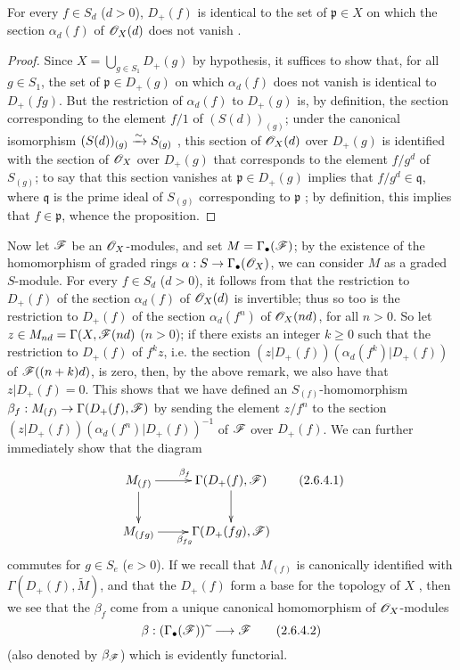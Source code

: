 \begin{proposition}[2.6.3]
\label{II.2.6.3}
For every $f\in S_d$ ($d>0$), $D_+(f)$ is identical to the set of $\mathfrak{p}\in X$ on which the section $\alpha_d(f)$ of $\mathscr{O}_X(d)$ does not vanish .
\end{proposition}

\begin{proof}
Since $X=\bigcup_{g\in S_1}D_+(g)$ by hypothesis, it suffices to show that, for all $g\in S_1$, the set of $\mathfrak{p}\in D_+(g)$ on which $\alpha_d(f)$ does not vanish is identical to $D_+(fg)$.
But the restriction of $\alpha_d(f)$ to $D_+(g)$ is, by definition, the section corresponding to the element $f/1$ of $(S(d))_{(g)}$;
under the canonical isomorphism $(S(d))_{(g)}\xrightarrow{\sim} S_{(g)}$ , this section of $\mathscr{O}_X(d)$ over $D_+(g)$ is identified with the section of $\mathscr{O}_X$ over $D_+(g)$ that corresponds to the element $f/g^d$ of $S_{(g)}$;
to say that this section vanishes at $\mathfrak{p}\in D_+(g)$ implies that $f/g^d\in\mathfrak{q}$, where $\mathfrak{q}$ is the prime ideal of $S_{(g)}$ corresponding to $\mathfrak{p}$ ;
by definition, this implies that $f\in\mathfrak{p}$, whence the proposition.
\end{proof}

\begin{env}[2.6.4]
\label{II.2.6.4}
Now let $\mathscr{F}$ be an $\mathscr{O}_X$-modules, and set $M=\Gamma_\bullet(\mathscr{F})$;
by the existence of the homomorphism of graded rings $\alpha: S\to\Gamma_\bullet(\sh{O}_X)$, we can consider $M$ as a graded $S$-module.
For every $f\in S_d$ ($d>0$), it follows from  that the restriction to $D_+(f)$ of the section $\alpha_d(f)$ of $\mathscr{O}_X(d)$ is invertible;
thus so too is the restriction to $D_+(f)$ of the section $\alpha_d(f^n)$ of $\mathscr{O}_X(nd)$, for all $n>0$.
So let $z\in M_{nd}=\Gamma(X,\mathscr{F}(nd)$ ($n>0$);
if there exists an integer $k\geq0$ such that the restriction to $D_+(f)$ of $f^kz$, i.e. the
section $(z|D_+(f))(\alpha_d(f^k)|D_+(f))$ of $\mathscr{F}((n+k)d)$, is zero, then, by the above remark, we also have that $z|D_+(f)=0$.
This shows that we have defined an $S_{(f)}$-homomorphism $\beta_f: M_{(f)}\to\Gamma(D_+(f),\sh{F})$ by sending the element $z/f^n$ to the section $(z|D_+(f))(\alpha_d(f^n)|D_+(f))^{-1}$ of $\mathscr{F}$ over $D_+(f)$.
We can further immediately show that the diagram
\[
\label{II.2.6.4.1}
  \xymatrix{
    M_{(f)} \ar[r]^{\beta_f} \ar[d]
    & \Gamma(D_+(f),\sh{F}) \ar[d]
  \\M_{(fg)} \ar[r]_{\beta_{fg}}
    & \Gamma(D_+(fg),\sh{F})
  }
\tag{2.6.4.1}
\]
commutes for $g\in S_e$ ($e>0$).
If we recall that $M_{(f)}$ is canonically identified with $\Gamma(D_+(f),\widetilde{M})$, and that the $D_+(f)$ form a base for the topology of $X$ , then we see that the $\beta_f$ come from a unique canonical homomorphism of $\mathscr{O}_X$-modules
\[
\label{II.2.6.4.2}
  \beta:(\Gamma_\bullet(\sh{F}))\supertilde\to\sh{F}
\tag{2.6.4.2}
\]
(also denoted by $\beta_{\mathscr{F}}$) which is evidently functorial.
\end{env}

